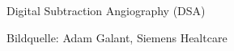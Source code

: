 \begin{frame}[c]{Digital Subtraction Angiography (DSA)}
\begin{center}
	\end{center}
	\hspace*{.8cm}  \tiny Bildquelle: Adam Galant, Siemens Healtcare


\end{frame}



